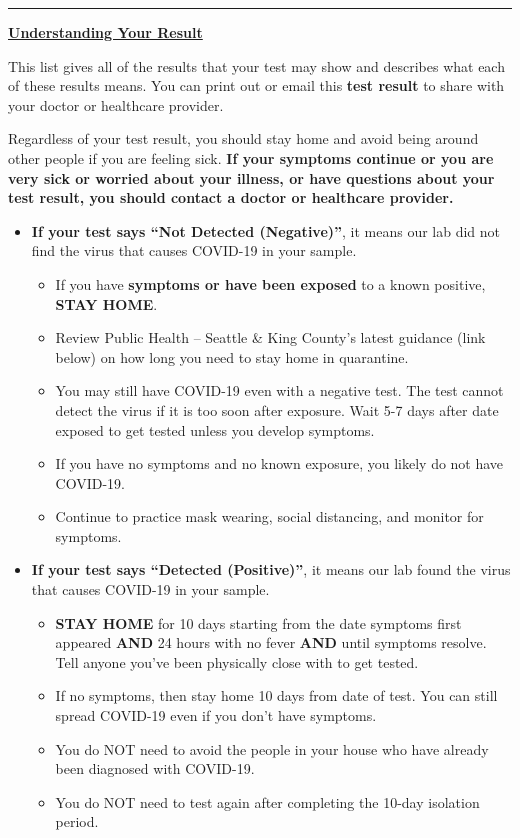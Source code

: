 \documentclass[10pt]{article}
\newcommand{\PageLine}{\rule{\textwidth}{0.25mm}}
\begin{document}
\PageLine
\bigskip

\large \underline{\textbf{Understanding Your Result}}

This list gives all of the results that your test may show and describes what
each of these results means. You can print out or email this \textbf{
test result} to share with your doctor or healthcare provider.

Regardless of your test result, you should stay home and avoid being around
other people if you are feeling sick. \textbf{If your symptoms continue or you are
very sick or worried about your illness, or have questions about your
test result, you should contact a doctor or healthcare provider.}

\begin{itemize}


\item

  \textbf{If your test says ``Not Detected (Negative)''}, it means our lab did not find the
  virus that causes COVID-19 in your sample.

  \begin{itemize}
    \item
      If you have \textbf{symptoms or have been exposed} to a known positive, \textbf{STAY HOME}.
    \item
      Review Public Health – Seattle \& King County’s latest guidance (link below) on how long you need to stay home in quarantine.
    \item
      You may still have COVID-19 even with a negative test. The test cannot detect the virus if it is too soon after exposure.
      Wait 5-7 days after date exposed to get tested unless you develop symptoms.
    \item
      If you have no symptoms and no known exposure, you likely do not have COVID-19.
    \item
      Continue to practice mask wearing, social distancing, and monitor for symptoms.
  \end{itemize}

\item

  \textbf{If your test says ``Detected (Positive)''}, it means our
  lab found the virus that causes COVID-19 in your sample.

  \begin{itemize}
    \item \textbf{STAY HOME} for 10 days starting from the date symptoms first appeared \textbf{AND} 24 hours with no fever \textbf{AND} until symptoms resolve. Tell anyone you’ve been physically close with to get tested.
    \item If no symptoms, then stay home 10 days from date of test. You can still spread COVID-19 even if you don’t have symptoms.
    \item You do NOT need to avoid the people in your house who have already been diagnosed with COVID-19.
    \item You do NOT need to test again after completing the 10-day isolation period.
  \end{itemize}


\end{itemize}
\end{document}
